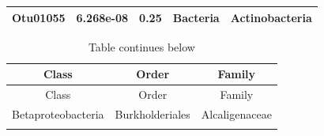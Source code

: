 \documentclass[]{article}
\begin{document}
\begin{longtable}[]{@{}ccccc@{}}
\begin{minipage}[t]{0.13\columnwidth}
Otu01055\strut
\end{minipage} & \begin{minipage}[t]{0.14\columnwidth}\centering\strut
6.268e-08\strut
\end{minipage} & \begin{minipage}[t]{0.12\columnwidth}\centering\strut
0.25\strut
\end{minipage} & \begin{minipage}[t]{0.13\columnwidth}\centering\strut
Bacteria\strut
\end{minipage} & \begin{minipage}[t]{0.19\columnwidth}\centering\strut
Actinobacteria\strut
\end{minipage}\tabularnewline
\bottomrule
\end{longtable}

\begin{longtable}[]{@{}ccc@{}}
\caption{Table continues below}\tabularnewline
\toprule
\begin{minipage}[b]{0.27\columnwidth}\centering\strut
Class\strut
\end{minipage} & \begin{minipage}[b]{0.23\columnwidth}\centering\strut
Order\strut
\end{minipage} & \begin{minipage}[b]{0.23\columnwidth}\centering\strut
Family\strut
\end{minipage}\tabularnewline
\midrule
\endfirsthead
\toprule
\begin{minipage}[b]{0.27\columnwidth}\centering\strut
Class\strut
\end{minipage} & \begin{minipage}[b]{0.23\columnwidth}\centering\strut
Order\strut
\end{minipage} & \begin{minipage}[b]{0.23\columnwidth}\centering\strut
Family\strut
\end{minipage}\tabularnewline
\midrule
\endhead
\begin{minipage}[t]{0.27\columnwidth}\centering\strut
Betaproteobacteria\strut
\end{minipage} & \begin{minipage}[t]{0.23\columnwidth}\centering\strut
Burkholderiales\strut
\end{minipage} & \begin{minipage}[t]{0.23\columnwidth}\centering\strut
Alcaligenaceae\strut
\end{minipage}\tabularnewline
\begin{minipage}[t]{0.27\columnwidth}\centering\strut

\end{minipage}
\end{longtable}
\end{document}
